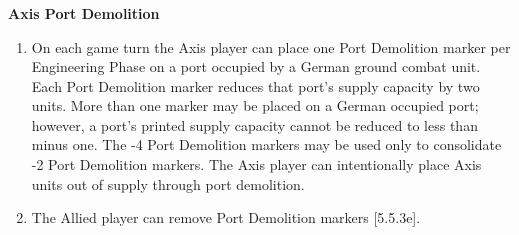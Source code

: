 \subsubsection{}\textbf{Axis Port Demolition}
\begin{enumerate}[label=\alph*.]
    \item On each game turn the Axis player can place one Port Demolition marker per Engineering Phase on a port occupied by a German ground combat unit. Each Port Demolition marker reduces that port's supply capacity by two units. More than one marker may be placed on a German occupied port; however, a port's printed supply capacity cannot be reduced to less than minus one. The -4 Port Demolition markers may be used only to consolidate -2 Port Demolition markers. The Axis player can intentionally place Axis units out of supply through port demolition.
    \item The Allied player can remove Port Demolition markers [5.5.3e].
\end{enumerate}